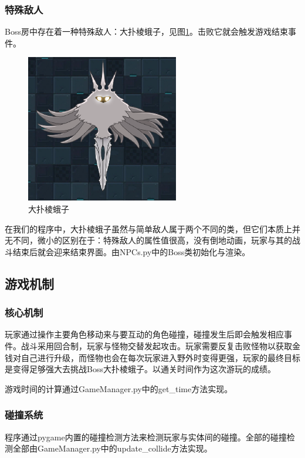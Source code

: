 \documentclass{ctexart}
\begin{document}
\subsubsection{特殊敌人}
Boss房中存在着一种特殊敌人：大扑棱蛾子，见图\ref{fig:大扑棱蛾子}。击败它就会触发游戏结束事件。
\begin{figure}[h]
\centering
\includegraphics[width=0.7\linewidth]{大扑棱蛾子.png}
\caption{\label{fig:大扑棱蛾子}大扑棱蛾子}
\end{figure}

在我们的程序中，大扑棱蛾子虽然与简单敌人属于两个不同的类，但它们本质上并无不同，微小的区别在于：特殊敌人的属性值很高，没有倒地动画，玩家与其的战斗结束后就会迎来结束界面。由NPCs.py中的Boss类初始化与渲染。

\subsection{游戏机制}
\subsubsection{核心机制}
玩家通过操作主要角色移动来与要互动的角色碰撞，碰撞发生后即会触发相应事件。战斗采用回合制，玩家与怪物交替发起攻击。玩家需要反复击败怪物以获取金钱对自己进行升级，而怪物也会在每次玩家进入野外时变得更强，玩家的最终目标是变得足够强大去挑战Boss大扑棱蛾子。以通关时间作为这次游玩的成绩。

游戏时间的计算通过GameManager.py中的get\_time方法实现。

\subsubsection{碰撞系统}
程序通过pygame内置的碰撞检测方法来检测玩家与实体间的碰撞。全部的碰撞检测全部由GameManager.py中的update\_collide方法实现。
\end{document}

